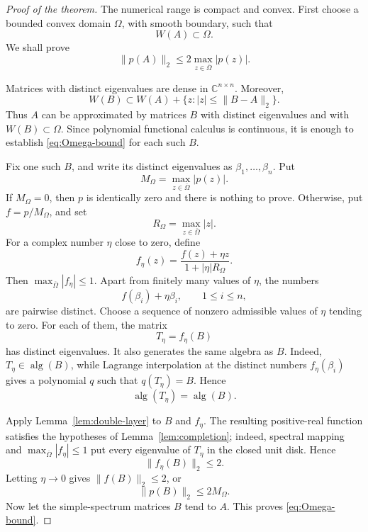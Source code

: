 \documentclass[11pt]{article}
\newcommand{\C}{\mathbb C}
\newcommand{\alg}{\operatorname{alg}}
\begin{document}
\begin{proof}[Proof of the theorem]
The numerical range is compact and convex.  First choose a bounded convex
domain \(\Omega\), with smooth boundary, such that
\[
 W(A)\subset\Omega.
\]
We shall prove
\begin{equation}
 \|p(A)\|_2\leq2\max_{z\in\overline\Omega}|p(z)|.
 \label{eq:Omega-bound}
\end{equation}

Matrices with distinct eigenvalues are dense in
\(\C^{n\times n}\).  Moreover,
\[
 W(B)\subset W(A)+\{z:|z|\leq\|B-A\|_2\}.
\]
Thus \(A\) can be approximated by matrices \(B\) with distinct
eigenvalues and with \(W(B)\subset\Omega\).  Since polynomial functional
calculus is continuous, it is enough to establish
\eqref{eq:Omega-bound} for each such \(B\).

Fix one such \(B\), and write its distinct eigenvalues as
\(\beta_1,\ldots,\beta_n\).  Put
\[
 M_\Omega=\max_{z\in\overline\Omega}|p(z)|.
\]
If \(M_\Omega=0\), then \(p\) is identically zero and there is nothing to
prove.  Otherwise, put \(f=p/M_\Omega\), and set
\[
 R_\Omega=\max_{z\in\overline\Omega}|z|.
\]
For a complex number \(\eta\) close to zero, define
\begin{equation}
 f_\eta(z)=\frac{f(z)+\eta z}{1+|\eta|R_\Omega}.
 \label{eq:f-eta}
\end{equation}
Then \(\max_{\overline\Omega}|f_\eta|\leq1\).  Apart from finitely many
values of \(\eta\), the numbers
\[
 f(\beta_i)+\eta\beta_i,
 \qquad 1\leq i\leq n,
\]
are pairwise distinct.  Choose a sequence of nonzero admissible values
of \(\eta\) tending to zero.  For each of them, the matrix
\[
 T_\eta=f_\eta(B)
\]
has distinct eigenvalues.  It also generates the same algebra as \(B\).
Indeed, \(T_\eta\in\alg(B)\), while Lagrange interpolation at the distinct
numbers \(f_\eta(\beta_i)\) gives a polynomial \(q\) such that
\(q(T_\eta)=B\).  Hence
\[
 \alg(T_\eta)=\alg(B).
\]

Apply Lemma~\ref{lem:double-layer} to \(B\) and \(f_\eta\).  The resulting
positive-real function satisfies the hypotheses of
Lemma~\ref{lem:completion}; indeed, spectral mapping and
\(\max_{\overline\Omega}|f_\eta|\leq1\) put every eigenvalue of
\(T_\eta\) in the closed unit disk.  Hence
\[
 \|f_\eta(B)\|_2\leq2.
\]
Letting \(\eta\to0\) gives \(\|f(B)\|_2\leq2\), or
\[
 \|p(B)\|_2\leq2M_\Omega.
\]
Now let the simple-spectrum matrices \(B\) tend to \(A\).  This proves
\eqref{eq:Omega-bound}.


\end{proof}
\end{document}
